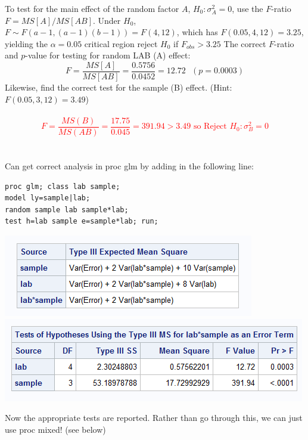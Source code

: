 To test for the main effect of the random factor $A$, $H_0: \sigma_A^2=0$, use the $F$-ratio $F=MS[A]/MS[AB]$.  Under $H_0$,
$F \sim F(a-1,(a-1)(b-1))=F(4,12)$, which has $F(0.05,4,12)=3.25$, yielding the $\alpha=0.05$ critical region reject $H_0$ if $F_{obs}>3.25$
The correct $F$-ratio and $p$-value for testing for random LAB (A) effect: 
$$ F=\frac{MS[A]}{MS[AB]} = \frac{0.5756}{0.0452}=12.72~~~(p=0.0003) $$
Likewise, find the correct test for the sample (B) effect. (Hint: $F(0.05,3,12)=3.49$)\\~\\%
\textcolor{red}{$$F=\frac{MS(B)}{MS(AB)}=\frac{17.75}{0.045}=391.94 > 3.49\mbox{ so Reject }H_0: \sigma^2_B=0$$}~\\~\\

Can get correct analysis in proc glm by adding in the following line:

\begin{small}
\begin{verbatim}
proc glm; class lab sample;
model ly=sample|lab;
random sample lab sample*lab; 
test h=lab sample e=sample*lab; run;
\end{verbatim}
\end{small}

\begin{center}
\includegraphics[scale=0.7]{MilkGLM3}\includegraphics[scale=0.7]{MilkGLM4}
\end{center}

Now the appropriate tests are reported.  Rather than go through this, we can just use proc mixed! (see below)\\~\\

